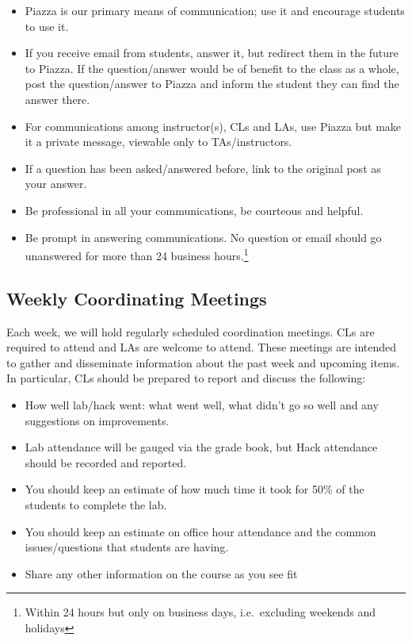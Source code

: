 \documentclass[12pt]{scrartcl}
\begin{document}
\begin{itemize}
  \item Piazza is our primary means of communication; use it and encourage 
students to use it.  
  \item If you receive email from students, answer it, 
but redirect them in the future to Piazza.  If the question/answer
would be of benefit to the class as a whole, post the question/answer
to Piazza and inform the student they can find the answer there.
  \item For communications among instructor(s), CLs and LAs, use Piazza but
make it a private message, viewable only to TAs/instructors.
  \item If a question has been asked/answered before, link to the original
  post as your answer.  
  \item Be professional in all your communications, be courteous and
  helpful.  
  \item Be prompt in answering communications.  No question or email should go 
  unanswered for more than 24 business hours.\footnote{Within 24 hours but only
  on business days, i.e.\ excluding weekends and holidays}
\end{itemize}

\subsection*{Weekly Coordinating Meetings}

Each week, we will hold regularly scheduled coordination meetings.  CLs are
required to attend and LAs are welcome to attend.
These meetings are intended to gather and disseminate information about the past
week and upcoming items.  In particular, CLs should be prepared to report and
discuss the following:
\begin{itemize}
  \item How well lab/hack went: what went well, what didn't go so well and any
  suggestions on improvements.
  \item Lab attendance will be gauged via the grade book, but Hack attendance 
  should be recorded and reported.
  \item You should keep an estimate of how much time it took for 50\% of the
  students to complete the lab.
  \item You should keep an estimate on office hour attendance and the common
  issues/questions that students are having.
  \item Share any other information on the course as you see fit
\end{itemize}
\end{document}
